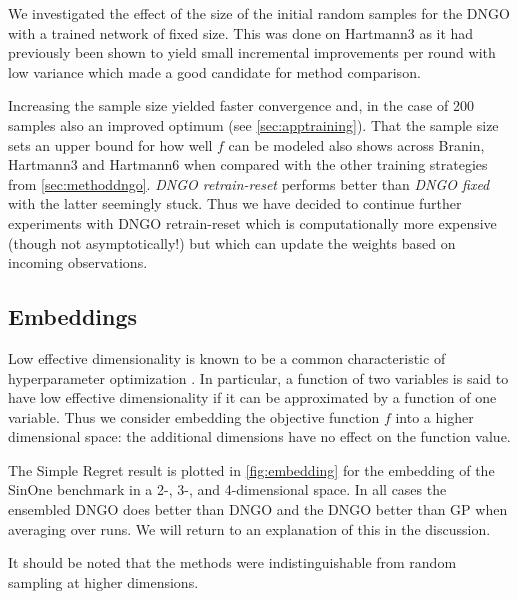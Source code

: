 \documentclass[conference,compsoc]{IEEEtran}
\theoremstyle{definition}
\begin{document}
        We investigated the effect of the size of the initial random samples for the DNGO with a trained network of fixed size.
        This was done on Hartmann3 as it had previously been shown to yield small incremental improvements per round with low variance which made a good candidate for method comparison.

        Increasing the sample size yielded faster convergence and, in the case of 200 samples also an improved optimum (see \cref{sec:apptraining}).
        That the sample size sets an upper bound for how well $f$ can be modeled also shows across Branin, Hartmann3 and Hartmann6 when compared with the other training strategies from \cref{sec:methoddngo}.
        \emph{DNGO retrain-reset} performs better than \emph{DNGO fixed} with the latter seemingly stuck.
        Thus we have decided to continue further experiments with DNGO retrain-reset which is computationally more expensive (though not asymptotically!) but which can update the weights based on incoming observations.

    \subsection{Embeddings}\label{sec:exp-embeddings}

        Low effective dimensionality is known to be a common characteristic of hyperparameter optimization \parencite{bergstra_random_2012, chen_joint_2012, wang_bayesian_2013}.
        In particular, a function of two variables is said to have low effective dimensionality if it can be approximated by a function of one variable.
        Thus we consider embedding the objective function $f$ into a higher dimensional space: the additional dimensions have no effect on the function value.

        The Simple Regret result is plotted in \cref{fig:embedding} for the embedding of the SinOne benchmark in a 2-, 3-, and 4-dimensional space.
        In all cases the ensembled DNGO does better than DNGO and the DNGO better than GP when averaging over runs.
        We will return to an explanation of this in the discussion.

        It should be noted that the methods were indistinguishable from random sampling at higher dimensions.

\end{document}
